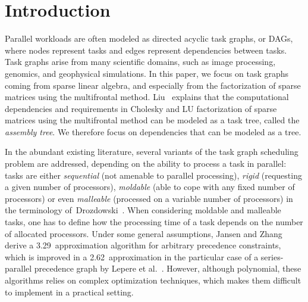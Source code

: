 \documentclass{llncs}
\begin{document}
\section{Introduction}
\label{sec:intro}


Parallel workloads are often modeled as directed acyclic task graphs,
or DAGs, where nodes represent tasks and edges represent dependencies
between tasks. Task graphs arise from many scientific domains, such as
image processing, genomics, and geophysical simulations. In this
paper, we focus on task graphs coming from sparse linear algebra, and
especially from the factorization of sparse matrices using the
multifrontal method. Liu~\cite{liu:90} explains that the computational
dependencies and requirements in Cholesky and LU factorization of
sparse matrices using the multifrontal method can be modeled as a task
tree, called the \emph{assembly tree}. We therefore focus on
dependencies that can be modeled as a tree.


In the abundant existing literature, several variants of the task
graph scheduling problem are addressed, depending on the ability to
process a task in parallel: tasks are either \emph{sequential} (not
amenable to parallel processing), \emph{rigid} (requesting a given
number of processors), \emph{moldable} (able to cope with any fixed
number of processors) or even \emph{malleable} (processed on a variable
number of processors) in the terminology of~Drozdowski~\cite[chapter
25]{handbook}. When considering moldable and malleable tasks, one has
to define how the processing time of a task depends on the number of
allocated  processors.  Under some general
assumptions, Jansen and Zhang~\cite{jansen05} derive a
3.29~approximation algorithm for arbitrary precedence constraints,
which is improved in a 2.62~approximation in the particular case of a
series-parallel precedence graph by Lepere et
al.~\cite{lepere02}. However, although polynomial, these algorithms
relies on complex optimization techniques, which makes them difficult
to implement in a practical setting.
\end{document}
